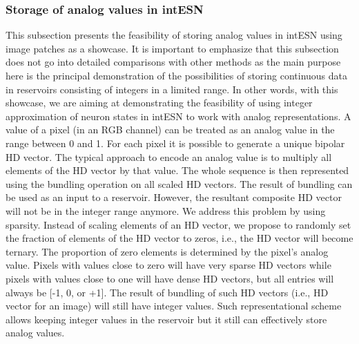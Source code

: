 \subsubsection{Storage of analog values in intESN}
\label{sect:perf:analog}







This subsection presents the feasibility of storing analog values in intESN using image patches as a showcase. 
It is important to emphasize that this subsection  does not go into detailed comparisons with other methods as the main purpose here is 
the principal demonstration of the possibilities of storing continuous data in reservoirs consisting of integers in a limited range. 
In other words, with this showcase, we are aiming at demonstrating the feasibility of using integer approximation of neuron states in intESN to work with analog representations.
A value of a pixel (in an RGB channel) can be treated as an analog value in the range between 0 and 1. 
For each pixel it is possible to generate a unique bipolar HD vector. 
The typical approach to encode an analog value is to multiply all elements of the HD vector by that value.
The whole sequence is then represented using the bundling operation on all scaled HD vectors. The result of bundling can be used as an input to a reservoir. However, the resultant composite HD vector will not be in the integer range anymore. 
We address this problem by using sparsity.
Instead of scaling elements of an HD vector, we propose to randomly set the fraction of elements of the HD vector to zeros, i.e., the HD vector will become ternary. The proportion of zero elements is determined by the pixel's analog value. Pixels with values close to zero will have very sparse HD vectors while pixels with values close to one will have dense HD vectors, but all entries will always be
[-1, 0, or +1].
The result of bundling of such HD vectors (i.e., HD vector for an image) will still have integer values. Such representational scheme allows keeping integer values in the reservoir but it still can effectively store analog values.




